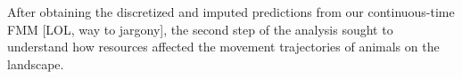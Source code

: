 \documentclass[a4paper]{article}
\begin{document}





After obtaining the discretized and imputed predictions from our continuous-time FMM [LOL, way to jargony], the second step of the analysis sought to understand how resources affected the movement trajectories of animals on the landscape.
\end{document}
